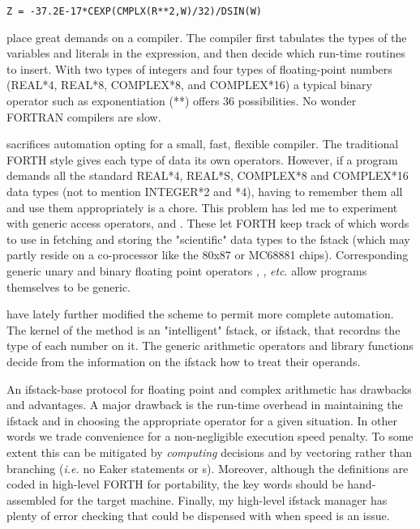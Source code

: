 \begin{lstlisting}
Z = -37.2E-17*CEXP(CMPLX(R**2,W)/32)/DSIN(W)
\end{lstlisting}

place great demands on a compiler. The compiler first tabulates the types of the variables and literals in the expression, and then decide which run-time routines to insert. With two types of integers and four types of floating-point numbers (REAL*4, REAL*8, COMPLEX*8, and COMPLEX*16) a typical binary operator such as exponentiation (**) offers 36 possibilities. No wonder FORTRAN compilers are slow. 

 sacrifices automation opting for a small, fast, flexible compiler. The traditional FORTH style gives each type of data its own operators. However, if a program demands all the standard REAL*4, REAL*S, COMPLEX*8 and COMPLEX*16 data types (not to mention INTEGER*2 and *4), having to remember them all and use them appropriately is a chore. This problem has led me to experiment with generic access operators,  and . These let FORTH keep track of which words to use in fetching and storing the "scientific" data types to the fstack (which may partly reside on a co-processor like the 80x87 or MC68881 chips). Corresponding generic unary and binary floating point operators , , \textit{etc}. allow programs themselves to be generic.

have lately further modified the scheme to permit more complete automation. The kernel of the method is an "intelligent" fstack, or ifstack, that recordns the type of each number on it. The generic arithmetic operators and library functions decide from the information on the ifstack how to treat their operands.

An ifstack-base protocol for floating point and complex arithmetic has drawbacks and advantages. A major drawback is the run-time overhead in maintaining the ifstack and in choosing the appropriate operator for a given situation. In other words we trade convenience for a non-negligible execution speed penalty. To some extent this can be mitigated by \textit{computing} decisions and by vectoring rather than branching (\textit{i.e.} no Eaker  statements or s). Moreover, although the definitions are coded in high-level FORTH for portability, the key words should be hand-assembled for the target machine. Finally, my high-level ifstack manager has plenty of error checking that could be dispensed with when speed is an issue.

